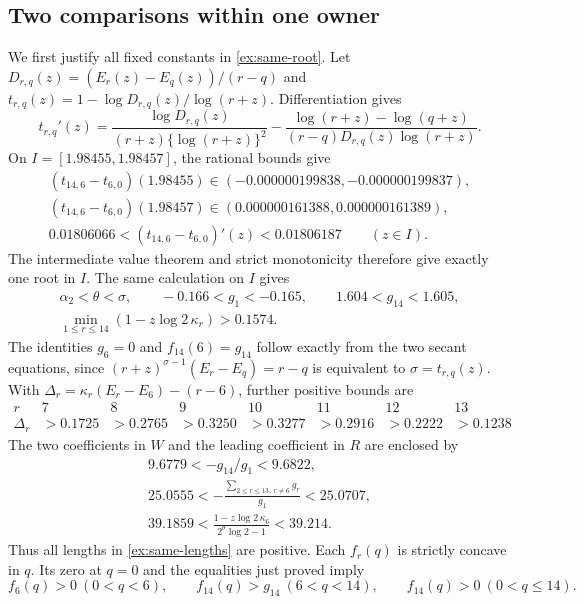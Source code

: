 \subsection{Two comparisons within one owner}

We first justify all fixed constants in \eqref{ex:same-root}.  Let
\(D_{r,q}(z)=(E_r(z)-E_q(z))/(r-q)\) and
\(t_{r,q}(z)=1-\log D_{r,q}(z)/\log(r+z)\).  Differentiation gives
\begin{equation}
 t_{r,q}'(z)=
 \frac{\log D_{r,q}(z)}{(r+z)\{\log(r+z)\}^2}
 -\frac{\log(r+z)-\log(q+z)}
 {(r-q)D_{r,q}(z)\log(r+z)}.
 \label{exapp:secant-derivative}
\end{equation}
On \(I=[1.98455,1.98457]\), the rational bounds give
\begin{gather*}
 (t_{14,6}-t_{6,0})(1.98455)
       \in(-0.000000199838,-0.000000199837),\\
 (t_{14,6}-t_{6,0})(1.98457)
       \in(0.000000161388,0.000000161389),\\
 0.01806066<(t_{14,6}-t_{6,0})'(z)<0.01806187
       \qquad(z\in I).
\end{gather*}
The intermediate value theorem and strict monotonicity therefore
give exactly one root in \(I\).  The same calculation on \(I\)
gives
\begin{equation}
 \begin{gathered}
 \alpha_2<\theta<\sigma,\qquad
 -0.166<g_1<-0.165,\qquad 1.604<g_{14}<1.605,\\
 \min_{1\le r\le14}(1-z\log2\,\kappa_r)>0.1574.
 \end{gathered}
 \label{exapp:same-fixed-signs}
\end{equation}
The identities \(g_6=0\) and \(f_{14}(6)=g_{14}\) follow exactly
from the two secant equations, since
\((r+z)^{\sigma-1}(E_r-E_q)=r-q\) is equivalent to
\(\sigma=t_{r,q}(z)\).  With
\(\Delta_r=\kappa_r(E_r-E_6)-(r-6)\), further positive bounds are
\[
\begin{array}{c|rrrrrrr}
 r&7&8&9&10&11&12&13\\ \hline
 \Delta_r&
 >0.1725&>0.2765&>0.3250&>0.3277&>0.2916&>0.2222&>0.1238
\end{array}
\]
The two coefficients in \(W\) and the leading coefficient in \(R\)
are enclosed by
\begin{gather*}
 9.6779<-g_{14}/g_1<9.6822,\\
 25.0555<-\frac{\sum_{2\le r\le13,\ r\ne6}g_r}{g_1}<25.0707,\\
 39.1859<\frac{1-z\log2\,\kappa_6}{2^\theta\log2-1}<39.214.
\end{gather*}
Thus all lengths in \eqref{ex:same-lengths} are positive.  Each
\(f_r(q)\) is strictly concave in \(q\).  Its zero at \(q=0\)
and the equalities just proved imply
\begin{equation}
 f_6(q)>0\ (0<q<6),\qquad
 f_{14}(q)>g_{14}\ (6<q<14),\qquad
 f_{14}(q)>0\ (0<q\le14).
 \label{exapp:same-concavity}
\end{equation}

